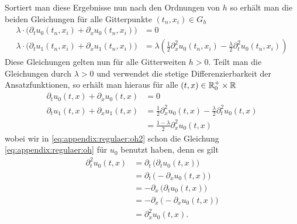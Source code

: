 Sortiert man diese Ergebnisse nun nach den Ordnungen von $h$ so erhält man die beiden Gleichungen für alle Gitterpunkte $(t_n, x_i) \in G_h$
\begin{align*}
\lambda \cdot \bigl( \partial_t u_0(t_n, x_i) + \partial_x u_0(t_n, x_i) \bigr) &= 0\\
\lambda \cdot \bigl( \partial_t u_1(t_n, x_i) + \partial_x u_1(t_n, x_i) \bigr) &= \lambda \left( \frac{1}{2} \partial^2_x u_0(t_n, x_i) - \frac{\lambda}{2} \partial^2_t u_0(t_n, x_i) \right)
\end{align*}
Diese Gleichungen gelten nun für alle Gitterweiten $h > 0$.
Teilt man die Gleichungen durch $\lambda > 0$ und verwendet die stetige Differenzierbarkeit der Ansatzfunktionen, so erhält man hieraus für alle $(t,x) \in \mathbb R^+_0 \times \mathbb R$
\begin{align}\label{eq:appendix:regulaer:oh}
\partial_t u_0(t, x) + \partial_x u_0(t, x) &= 0\\
\partial_t u_1(t, x) + \partial_x u_1(t, x) &= \frac{1}{2} \partial^2_x u_0(t, x) - \frac{\lambda}{2} \partial^2_t u_0(t, x) \nonumber\\
&= \frac{1-\lambda}{2} \partial^2_x u_0(t, x) \label{eq:appendix:regulaer:oh2}
\end{align}
wobei wir in \eqref{eq:appendix:regulaer:oh2} schon die Gleichung \eqref{eq:appendix:regulaer:oh} für $u_0$ benutzt haben, denn es gilt
\begin{align*}
\partial^2_t u_0(t,x) &= \partial_t \, \bigl( \partial_t u_0(t,x) \bigr)\\
&= \partial_t \, \bigl( - \partial_x u_0(t,x) \bigr)\\
&= - \partial_x \, \bigl( \partial_t u_0(t,x) \bigr)\\
&= - \partial_x \, \bigl( - \partial_x u_0(t,x) \bigr)\\
&= \partial^2_x u_0(t,x).
\end{align*}

